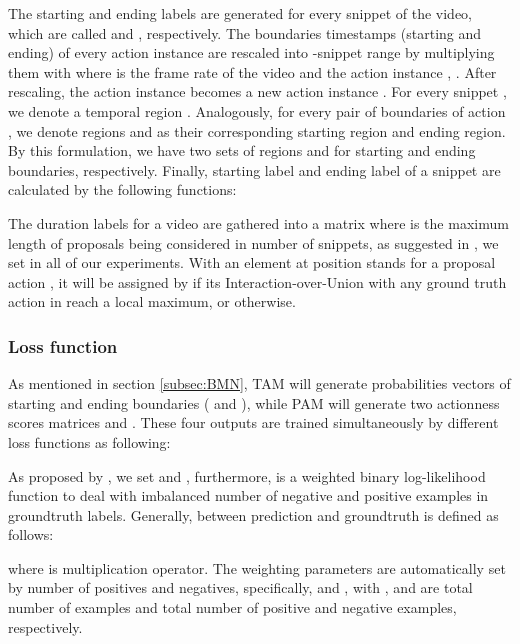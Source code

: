 \documentclass{ieeeaccess}
\begin{document}
The starting and ending labels are generated for every snippet of the video, which are called  and , respectively. The boundaries timestamps (starting and ending) of every action instance  are rescaled into -snippet range by multiplying them with  where  is the frame rate of the video and the action instance ,  . After rescaling, the action instance  becomes a new action instance . For every snippet , we denote a temporal region . Analogously, for every pair of boundaries  of action , we denote regions  and  as their corresponding starting region and ending region. By this formulation, we have two sets of regions  and  for starting and ending boundaries, respectively. Finally, starting label  and ending label  of a snippet  are calculated by the following functions:

\begin{multicols}{2}



\end{multicols}

The duration labels for a video are gathered into a matrix  where  is the maximum length of proposals being considered in number of snippets, as suggested in \cite{bmn}, we set  in all of our experiments. With an element at position  stands for a proposal action , it will be assigned by  if its Interaction-over-Union with any ground truth action in  reach a local maximum, or  otherwise.

\subsubsection{Loss function}

As mentioned in section \ref{subsec:BMN}, TAM will generate probabilities vectors of starting and ending boundaries ( and ), while PAM will generate two actionness scores matrices  and . These four outputs are trained simultaneously by different loss functions as following:




As proposed by \cite{bmn, lin2018bsn}, we set  and , furthermore,  is a weighted binary log-likelihood function to deal with imbalanced number of negative and positive examples in groundtruth labels. Generally,  between prediction  and groundtruth  is defined as follows:

where  is multiplication operator. The weighting parameters are automatically set by number of positives and negatives, specifically,  and , with ,  and  are total number of examples and total number of positive and negative examples, respectively.
\end{document}
